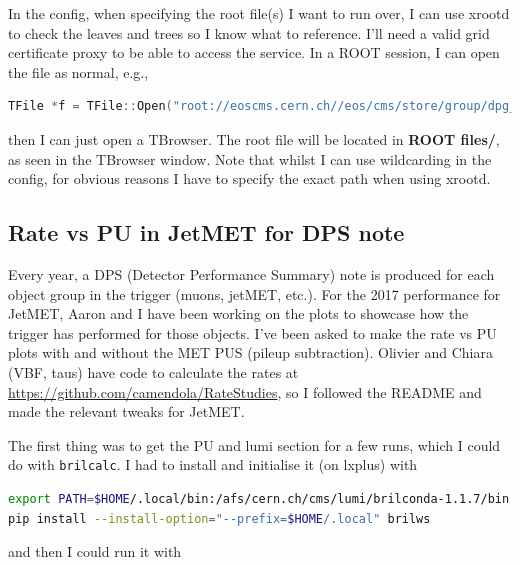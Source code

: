 In the config, when specifying the root file(s) I want to run over, I can use xrootd to check the leaves and trees so I know what to reference. I'll need a valid grid certificate proxy to be able to access the service. In a ROOT session, I can open the file as normal, e.g.,

\begin{lstlisting}[belowskip=-0.7cm, language=C++, numbers=none]
TFile *f = TFile::Open("root://eoscms.cern.ch//eos/cms/store/group/dpg_trigger/comm_trigger/L1Trigger/safarzad/2017/ZeroBias/Collision2017-noRECO-l1t-integration-96p20/ZeroBias/crab_Collision2017-noRECO-l1t-integration-96p20__ZeroBias_Run2017C/170726_094745/0000/L1Ntuple_1.root")
\end{lstlisting}

then I can just open a TBrowser. The root file will be located in \textbf{ROOT files/}, as seen in the TBrowser window. Note that whilst I can use wildcarding in the config, for obvious reasons I have to specify the exact path when using xrootd.

\fi



\subsection{Rate vs PU in JetMET for DPS note}

Every year, a DPS (Detector Performance Summary) note is produced for each object group in the trigger (muons, jetMET, etc.). For the 2017 performance for JetMET, Aaron and I have been working on the plots to showcase how the trigger has performed for those objects. I've been asked to make the rate vs PU plots with and without the MET PUS (pileup subtraction). Olivier and Chiara (VBF, taus) have code to calculate the rates at \url{https://github.com/camendola/RateStudies}, so I followed the README and made the relevant tweaks for JetMET.

The first thing was to get the PU and lumi section for a few runs, which I could do with \texttt{brilcalc}. I had to install and initialise it (on lxplus) with

\begin{lstlisting}[belowskip=-0.7cm, language=sh, numbers=none]
export PATH=$HOME/.local/bin:/afs/cern.ch/cms/lumi/brilconda-1.1.7/bin:$PATH # Needed each time to initialise
pip install --install-option="--prefix=$HOME/.local" brilws
\end{lstlisting}

and then I could run it with

